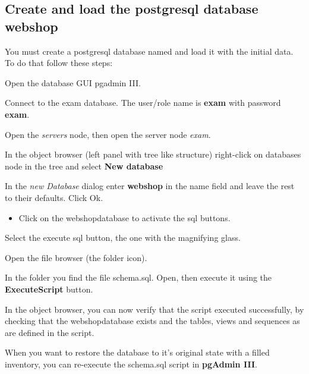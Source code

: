 \providecommand\dbname{webshop}
\subsection{Create and load the postgresql database \dbname}

You must create a postgresql database named \Code{\dbname} and load it
with the initial data. To do that follow these steps:
\begin{enumerate*}\itemsep1pt\parskip0pt
\item Open the database GUI pgadmin III.
\item Connect to the exam database. The user/role name is
  \textbf{exam} with password \textbf{exam}.
\item Open the \textit{servers} node, then open the server node \textit{exam}.
\item In the object browser (left panel with tree like structure)
  right-click on databases node in the tree and select \textbf{New database}
\item In the \textit{new Database} dialog enter \textbf{\dbname} in
  the name field and leave the rest to their defaults. Click Ok.
  \begin{itemize}
  \item Click on the \dbname database to activate the sql buttons.
  \end{itemize}
\item Select the execute sql button, the one with the magnifying
  glass.
\item Open the file browser (the folder icon).
\item In the folder  you find the file
  {schema.sql}. Open, then execute it using the \textbf{ExecuteScript} button.
\item In the object browser, you can now verify that the script
  executed  successfully, by checking that the \dbname database exists
  and the tables, views and sequences as are defined in the
  script. 
\end{enumerate*}

When you want to restore the database to it's original state with a
filled inventory, you can re-execute the schema.sql script in
\textbf{pgAdmin III}.

